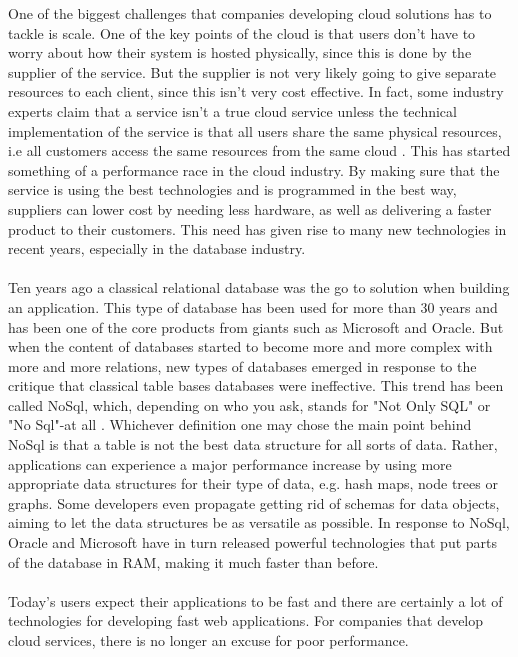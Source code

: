 \documentclass{cslthse-msc}
\begin{document}
One of the biggest challenges that companies developing cloud solutions has to tackle is scale. One of the key points of the cloud is that users don't have to worry about how their system is hosted physically, since this is done by the supplier of the service. But the supplier is not very likely going to give separate resources to each client, since this isn't very cost effective. In fact, some industry experts claim that a service isn't a true cloud service unless the technical implementation of the service is that all users share the same physical resources, i.e all customers access the same resources from the same cloud \cite{Netsuite15}. This has started something of a performance race in the cloud industry. By making sure that the service is using the best technologies and is programmed in the best way, suppliers can lower cost by needing less hardware, as well as delivering a faster product to their customers. This need has given rise to many new technologies in recent years, especially in the database industry.\\\\
Ten years ago a classical relational database was the go to solution when building an application. This type of database has been used for more than 30 years and has been one of the core products from giants such as Microsoft and Oracle. But when the content of databases started to become more and more complex with more and more relations, new types of databases emerged in response to the critique that classical table bases databases were ineffective. This trend has been called NoSql, which, depending on who you ask, stands for "Not Only SQL" or "No Sql"-at all \cite{Fowler12}. Whichever definition one may chose the main point behind NoSql is that a table is not the best data structure for all sorts of data. Rather, applications can experience a major performance increase by using more appropriate data structures for their type of data, e.g. hash maps, node trees or graphs. Some developers even propagate getting rid of schemas for data objects, aiming to let the data structures be as versatile as possible. In response to NoSql, Oracle and Microsoft have in turn released powerful technologies that put parts of the database in RAM, making it much faster than before.\\\\
Today's users expect their applications to be fast and there are certainly a lot of technologies for developing fast web applications. For companies that develop cloud services, there is no longer an excuse for poor performance.
\end{document}
